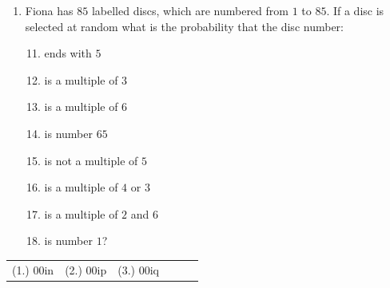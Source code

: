 \begin{exercises}{}
{\begin{enumerate}[itemsep=6pt, label=\textbf{\arabic*}. ]
\begin{enumerate}[noitemsep, label=\textbf{(\alph*)} ]
    \item a female
    \item a $4$ year old male
    \item aged $3$ or $4$
    \item aged $3$ and $4$
    \item not $5$
    \item either $3$ or female?
    \end{enumerate}
\item
Fiona has $85$ labelled discs, which are numbered from $1$ to
    $85$. If a disc is selected at random what is the probability that
    the disc number:
  \begin{enumerate}[noitemsep, label=\textbf{(\alph*)} ]
\setcounter{enumi}{10}
    \item ends with $5$
    \item is a multiple of $3$
    \item is a multiple of $6$
    \item is number $65$
    \item is not a multiple of $5$
    \item is a multiple of $4$ or $3$
    \item is a multiple of $2$ and $6$
    \item is number $1$?
    \end{enumerate}

 \end{enumerate}
\practiceinfo
\begin{tabular}{cccccc}
    (1.) 00in& (2.) 00ip& (3.) 00iq\\
  \end{tabular}
}
\end{exercises}
